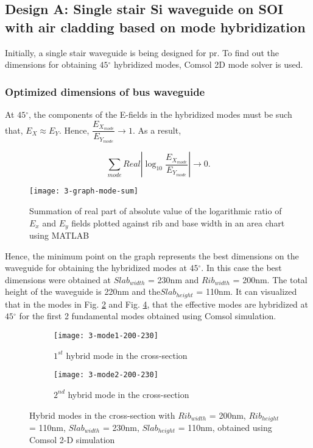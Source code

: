 \documentclass[../report.tex]{subfiles}
\begin{document}
		\subsection{Design A: Single stair Si waveguide on SOI with air cladding based on mode hybridization}
Initially, a single stair waveguide is being designed for \gls{pr}. To find out the dimensions for obtaining $45{^\circ}$ hybridized modes, Comsol 2D mode solver is used. 

\subsubsection{Optimized dimensions of bus waveguide}
At $45{^\circ}$, the components of the E-fields in the hybridized modes must be such that, $E_X \approx E_Y$. Hence, $\dfrac {E_{X_{mode}}} {E_{Y_{mode}}} \rightarrow 1$. As a result, 

\begin{equation}\label{eq:wg_dim_eq}
\sum _{mode}Real\left| \log _{10}\dfrac {E_{X_{mode}}} {E_{Y_{mode}}}\right| \rightarrow 0. 
\end{equation}

\begin{figure}[H] %
	\centering
	\texttt{[image: 3-graph-mode-sum]}
	\caption{Summation of real part of absolute value of the logarithmic ratio of $E_x$ and $E_y$ fields plotted against rib and base width in an area chart using MATLAB}
	\label{fig:3_graph_mode_sum}
\end{figure}  
\noindent Hence, the minimum point on the graph represents the best dimensions on the waveguide for obtaining the hybridized modes at $45{^\circ}$. In this case the best dimensions were obtained at $Slab_{width}$ = 230nm and $Rib_{width}$ = 200nm. The total height of the waveguide is 220nm and the$Slab_{height}$ = 110nm. It can visualized that in the modes in Fig. \ref{fig:3_mode1_200_230} and Fig. \ref{fig:3_mode2_200_230}, that the effective modes are hybridized at $45{^\circ}$ for the first 2 fundamental modes obtained using Comsol simulation.
\begin{figure}[H] %
	\begin{subfigure}[t]{0.45\textwidth}
		\texttt{[image: 3-mode1-200-230]}
		\caption{$1^{st}$ hybrid mode in the cross-section}
		\label{fig:3_mode1_200_230}
	\end{subfigure}
	\hfill
	\begin{subfigure}[t]{0.45\textwidth}
		\texttt{[image: 3-mode2-200-230]}
		\caption{$2^{nd}$ hybrid mode in the cross-section}
		\label{fig:3_mode2_200_230}
	\end{subfigure}
	\caption{Hybrid modes in the cross-section with $Rib_{width}$ = 200nm, $Rib_{height}$ = 110nm, $Slab_{width}$ = 230nm, $Slab_{height}$ = 110nm, obtained using Comsol 2-D simulation}
\end{figure}
\end{document}
